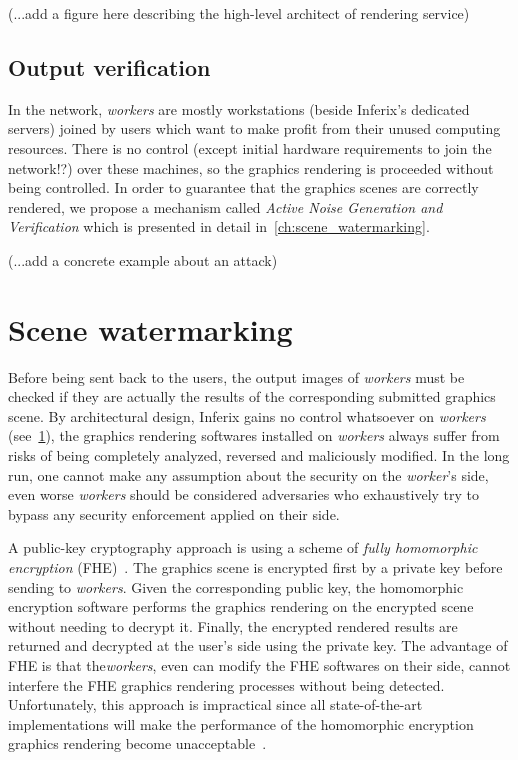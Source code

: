 \documentclass[a4paper,11pt,onecolumn]{memoir}
\begin{document}
(...add a figure here describing the high-level architect of rendering service)

\section[Output verification]{Output verification}\label{sec:output_verification}
In the network, \emph{workers} are mostly workstations (beside Inferix's dedicated servers) joined by users which want to make profit from their unused computing resources. There is no control (except initial hardware requirements to join the network!?) over these machines, so the graphics rendering is proceeded without being controlled. In order to guarantee that the graphics scenes are correctly rendered, we propose a mechanism called \emph{Active Noise Generation and Verification} which is presented in detail in~\autoref{ch:scene_watermarking}.

(...add a concrete example about an attack)

\chapter{Scene watermarking}\label{ch:scene_watermarking}
Before being sent back to the users, the output images of \emph{workers} must be checked if they are actually the results of the corresponding submitted graphics scene. By architectural design, Inferix gains no control whatsoever on \emph{workers} (see~\ref{sec:output_verification}), the graphics rendering softwares installed on \emph{workers} always suffer from risks of being completely analyzed, reversed and maliciously modified. In the long run, one cannot make any assumption about the security on the \emph{worker}'s side, even worse \emph{workers} should be considered adversaries who exhaustively try to bypass any security enforcement applied on their side.

A public-key cryptography approach is using a scheme of \emph{fully homomorphic encryption} (FHE)~\cite{Gentry2009}. The graphics scene is encrypted first by a private key before sending to \emph{workers}. Given the corresponding public key, the homomorphic encryption software performs the graphics rendering on the encrypted scene without needing to decrypt it. Finally, the encrypted rendered results are returned and decrypted at the user's side using the private key. The advantage of FHE is that the\emph{workers}, even can modify the FHE softwares on their side, cannot interfere the FHE graphics rendering processes without being detected. Unfortunately, this approach is impractical since all state-of-the-art implementations will make the performance of the homomorphic encryption graphics rendering become unacceptable~\cite{9910347}.
\end{document}
